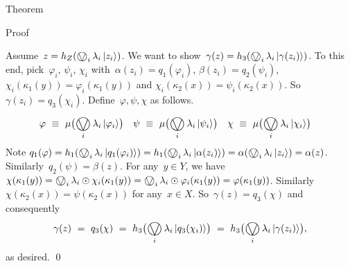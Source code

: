 \documentclass[b]{subfiles}
\begin{document}
\begin{parsec}
\begin{point}{Theorem}
\begin{point}{Proof}
\begin{point}
Assume~$z = h_Z(\bigovee_i \lambda_i \ket{z_i})$.
We want to show~$\gamma(z) = h_3(\bigovee_i \lambda_i \ket{\gamma(z_i)})$.
To this end, pick~$\varphi_i$, $\psi_i$, $\chi_i$
with~$\alpha(z_i) = q_1(\varphi_i)$,
$\beta(z_i) = q_2(\psi_i)$,
$\chi_i(\kappa_1(y)) = \varphi_i(\kappa_1(y))$
and $\chi_i(\kappa_2(x)) = \psi_i(\kappa_2(x))$.
So $\gamma(z_i) = q_3(\chi_i)$.
Define~$\varphi,\psi,\chi$ as follows.
\begin{align*}
\varphi &\ \equiv\  \mu\bigl(\bigovee_i \lambda_i \ket{\varphi_i}\bigr)&
\psi &\ \equiv\  \mu\bigl(\bigovee_i \lambda_i \ket{\psi_i}\bigr) &
\chi &\ \equiv\  \mu\bigl(\bigovee_i \lambda_i \ket{\chi_i}\bigr)
\end{align*}
Note
$q_1(\varphi)
    = h_1(\bigovee_i \lambda_i \ket{q_1(\varphi_i)})
    = h_1(\bigovee_i \lambda_i \ket{\alpha(z_i)})
    = \alpha(\bigovee_i \lambda_i \ket{z_i})
    = \alpha(z)$.
Similarly~$q_2(\psi) = \beta(z)$.
For any~$y \in Y$,
    we have
    $
    \chi(\kappa_1(y))
    = \bigovee_i \lambda_i \odot \chi_i(\kappa_1(y))
    = \bigovee_i \lambda_i \odot \varphi_i(\kappa_1(y))
    = \varphi(\kappa_1(y))
    $.
Similarly~$\chi(\kappa_2(x)) = \psi(\kappa_2(x))$ for any~$x \in X$.
So~$\gamma(z) = q_3(\chi)$ and consequently
\begin{equation*}
    \gamma(z) \ = \ q_3(\chi)
    \ = \ h_3\bigl(\bigovee_i \lambda_i\ket{q_3(\chi_i)} \bigr)
    \ = \ h_3\bigl(\bigovee_i \lambda_i\ket{\gamma(z_i)} \bigr),
\end{equation*}
as desired. \qed
\end{point}
\end{point}
\end{point}
\end{parsec}
\end{document}

